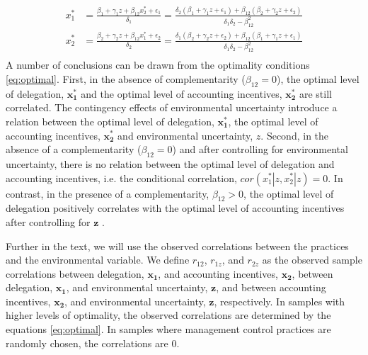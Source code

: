 \documentclass[12pt]{article}
\begin{document}
\begin{equation}\label{eq:optimal}
\begin{aligned}
x_1^* &= \frac{\beta_{1} + \gamma_1 z + \beta_{12} x_2^*  + \epsilon_{1}}{\delta_1 }
		      = \frac{\delta_2 (\beta_{1} + \gamma_1 z + \epsilon_1) 
           					+ \beta_{12} (\beta_{2} + \gamma_2 z + \epsilon_2) }
                            {\delta_1 \delta_2 - \beta_{12}^2} \\
 x_2^* &= \frac{\beta_{2} + \gamma_2 z + \beta_{12} x_1^* + \epsilon_{2}}{\delta_2  }
		      =  \frac{\delta_1 (\beta_{2} + \gamma_2 z + \epsilon_2) 
           					+ \beta_{12} (\beta_{1} + \gamma_1 z + \epsilon_1) }
                            {\delta_1 \delta_2 - \beta_{12}^2} \\
\end{aligned}
\end{equation}
A number of conclusions can be drawn from the optimality conditions \eqref{eq:optimal}. First, in the absence of complementarity ($\beta_{12}=0$), the optimal level of delegation, $\mathbf{x^*_1}$ and the optimal level of accounting incentives, $\mathbf{x^*_2}$ are still correlated. The contingency effects of environmental uncertainty introduce a relation between the optimal level of delegation, $\mathbf{x^*_1}$, the optimal level of accounting incentives, $\mathbf{x^*_2}$ and environmental uncertainty, $z$. Second, in the absence of a complementarity ($\beta_{12} = 0$) and after controlling for environmental uncertainty, there is no relation between the optimal level of delegation and accounting incentives, i.e. the conditional correlation, $cor(x^*_1 | z, x^*_2 |z) = 0$.  In contrast, in the presence of a complementarity, $\beta_{12} > 0$, the optimal level of delegation positively correlates with the optimal level of accounting incentives after controlling for $\mathbf{z}$ \citep{arora_testing_1996}. 

Further in the text, we will use the observed correlations between the practices and the environmental variable. We define $r_{12}$, $r_{1z}$, and $r_{2z}$ as the observed sample correlations between delegation, $\mathbf{x_1}$, and accounting incentives, $\mathbf{x_2}$,  between delegation, $\mathbf{x_1}$, and environmental uncertainty, $\mathbf{z}$, and between accounting incentives, $\mathbf{x_2}$, and environmental uncertainty, $\mathbf{z}$, respectively. In samples with higher levels of optimality, the observed correlations are determined by the equations \eqref{eq:optimal}.  In samples where management control practices are randomly chosen, the correlations are $0$. 
\end{document}
